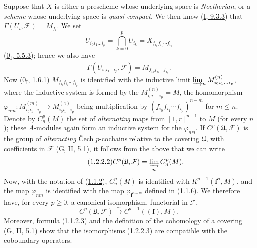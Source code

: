 \begin{env}[1.2.2]
\label{III.1.2.2}
Suppose that $X$ is either a prescheme whose underlying space is
\emph{Noetherian}, or a \emph{scheme} whose underlying space is
\emph{quasi-compact}. We then know (\hyperref[I.9.3.3]{I, 9.3.3}) that
$\Gamma(U_i,\mathcal F)=M_{f_i}$. We set
\[
U_{i_0i_1\ldots i_p}=\bigcap_{k=0}^p U_{i_k}
=X_{f_{i_0}f_{i_1}\cdots f_{i_p}}
\]
(\hyperref[0.5.5.3]{0\textsubscript{I}, 5.5.3}); hence we also have
\begin{equation}
\label{III.1.2.2.1}
\tag{1.2.2.1}
\Gamma(U_{i_0i_1\ldots i_p},\mathcal F)=M_{f_{i_0}f_{i_1}\cdots f_{i_p}}.
\end{equation}
Now (\hyperref[0.1.6.1]{0\textsubscript{I}, 1.6.1})
$M_{f_{i_0}f_{i_1}\cdots f_{i_p}}$ is identified with the inductive limit
$\varinjlim_n M_{i_0i_1\ldots i_p}^{(n)}$, where the inductive system is
formed by the $M_{i_0i_1\ldots i_p}^{(n)}=M$, the homomorphism
$\varphi_{nm}:M_{i_0i_1\ldots i_p}^{(m)}\to
M_{i_0i_1\ldots i_p}^{(n)}$ being multiplication by
$(f_{i_0}f_{i_1}\cdots f_{i_p})^{n-m}$ for $m\leq n$. Denote by
$C_n^p(M)$ the set of \emph{alternating} maps from $[1,r]^{p+1}$
to $M$ (for every $n$); these $A$-modules again form an inductive system
for the $\varphi_{nm}$. If $C^p(\mathfrak U,\mathcal F)$ is the group of
\emph{alternating} Čech $p$-cochains relative to the covering $\mathfrak U$,
with coefficients in $\mathcal F$ (G, II, 5.1), it follows from the above
that we can write
\begin{equation}
\label{III.1.2.2.2}
\tag{1.2.2.2}
C^p(\mathfrak U,\mathcal F)=\varinjlim_n C_n^p(M).
\end{equation}
Now, with the notation of (\hyperref[III.1.1.2]{1.1.2}), $C_n^p(M)$
is identified with $K^{p+1}(\mathbf f^n,M)$, and the map $\varphi_{nm}$
is identified with the map $\varphi_{\mathbf f^{n-m}}$ defined in
(\hyperref[III.1.1.6]{1.1.6}). We therefore have, for every $p\geq0$, a
canonical isomorphism, functorial in $\mathcal F$,
\begin{equation}
\label{III.1.2.2.3}
\tag{1.2.2.3}
C^p(\mathfrak U,\mathcal F)\xrightarrow{\sim}C^{p+1}((\mathbf f),M).
\end{equation}
Moreover, formula (\hyperref[III.1.1.2.3]{1.1.2.3}) and the definition of
the cohomology of a covering (G, II, 5.1) show that the isomorphisms
(\hyperref[III.1.2.2.3]{1.2.2.3}) are compatible with the coboundary
operators.
\end{env}

